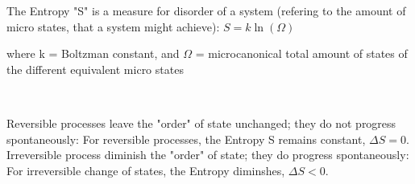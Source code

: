 The Entropy "S" is a measure for disorder of a system (refering to the amount of micro states, that a system might achieve): 
$
S = k \ln(\Omega)
$
\cite{pfeiler_experimentalphysik_Ed1_V2}

where k = Boltzman constant, and $\Omega$ = microcanonical total amount of states of the different equivalent micro states

\

Reversible processes leave the "order" of state unchanged; they do not progress spontaneously: For reversible processes, the Entropy S remains constant, $\Delta S = 0$. Irreversible process diminish the "order" of state; they do progress spontaneously: For irreversible change of states, the Entropy diminshes, $\Delta S < 0$. \cite{pfeiler_experimentalphysik_Ed1_V2}
